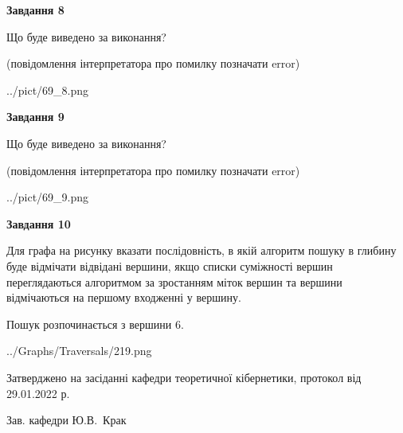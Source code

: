 \documentclass[12pt, ukrainian]{article}
\begin{document}
{\begin {large}
{\begin {center}\textbf{Завдання 8}\end {center}}\par
Що буде виведено за виконання?\par
 (повідомлення інтерпретатора про помилку позначати error)
\begin{center}
	{../pict/69_8.png}
\end{center}
\newpage

{\begin {center}\textbf{Завдання 9}\end {center}}\par
Що буде виведено за виконання?\par
 (повідомлення інтерпретатора про помилку позначати error)\par
\begin{center}
	{../pict/69_9.png}
\end{center}
\newpage

{\begin {center}\textbf{Завдання 10}\end {center}}\par
Для графа на рисунку вказати послідовність, в якій алгоритм пошуку в глибину буде відмічати відвідані вершини, якщо списки суміжності вершин переглядаються алгоритмом за зростанням міток вершин та вершини відмічаються на першому вход\-женні у вершину.\par
Пошук розпочинається з вершини 6.\par

\begin{center}
	{../Graphs/Traversals/219.png}
\end{center}\par
\newpage


\end {large}
}
{\smallskip \begin {small} Затверджено на засіданні кафедри теоретичної кібернетики, протокол  від   29.01.2022 р.\par\smallskip\smallskip
{\parbox {6.5 cm}{Зав. кафедри \dotfill Ю.В.~Крак}} \end{small}}
\end{document}
